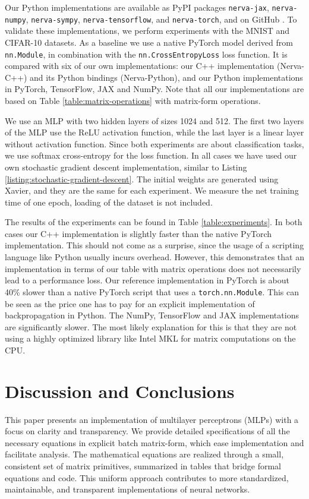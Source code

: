 \documentclass[twoside,11pt]{article}
\begin{document}
Our Python implementations are available as PyPI \citep{PyPI} packages
\texttt{nerva-jax},
\texttt{nerva-numpy},
\texttt{nerva-sympy},
\texttt{nerva-tensorflow}, and
\texttt{nerva-torch}, and on GitHub \citep{Wesselink_Nerva_library}.
To validate these implementations, we perform experiments with the MNIST \citep{DBLP:journals/spm/Deng12} and CIFAR-10 \citep{krizhevsky2009learning} datasets. As a baseline we use a native PyTorch model derived from \texttt{nn.Module}, in combination with the \texttt{nn.CrossEntropyLoss} loss function. It is compared with six of our own implementations: our C++ implementation (Nerva-C++) and its Python bindings (Nerva-Python), and our Python implementations in PyTorch, TensorFlow, JAX and NumPy. Note that all our implementations are based on Table \ref{table:matrix-operations} with matrix-form operations.

We use an MLP with two hidden layers of sizes 1024 and 512. The first two layers of the MLP use the ReLU activation function, while the last layer is a linear layer without activation function. Since both experiments are about classification tasks, we use softmax cross-entropy for the loss function. In all cases we have used our own stochastic gradient descent implementation, similar to Listing \ref{listing:stochastic-gradient-descent}.
The initial weights are generated using Xavier, and they are the same for each experiment.
We measure the net training time of one epoch, loading of the dataset is not included.

The results of the experiments can be found in Table \ref{table:experiments}. In both cases our C++ implementation is slightly faster than the native PyTorch implementation. This should not come as a surprise, since the usage of a scripting language like Python usually incurs overhead. However, this demonstrates that an implementation in terms of our table with matrix operations does not necessarily lead to a performance loss.
Our reference implementation in PyTorch is about 40\% slower than a native PyTorch script that uses a \texttt{torch.nn.Module}. This can be seen as the price one has to pay for an explicit implementation of backpropagation in Python. The NumPy, TensorFlow and JAX implementations are significantly slower. The most likely explanation for this is that they are not using a highly optimized library like Intel MKL for matrix computations on the CPU.

\section{Discussion and Conclusions} \label{section:conclusions}
This paper presents an implementation of multilayer perceptrons (MLPs) with a focus on clarity and transparency.
We provide detailed specifications of all the necessary equations in explicit batch matrix-form,
which ease implementation and facilitate analysis.
The mathematical equations are realized through a small, consistent set of matrix primitives,
summarized in tables that bridge formal equations and code.
This uniform approach contributes to more standardized, maintainable, and transparent implementations of neural networks.
\end{document}
